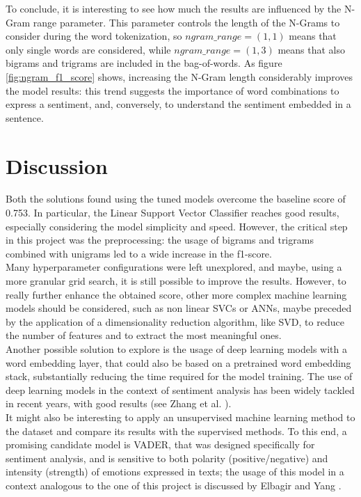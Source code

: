 \documentclass[conference]{IEEEtran}
\begin{document}
To conclude, it is interesting to see how much the results are influenced by the N-Gram range parameter. This parameter controls the length of the N-Grams to consider during the word tokenization, so $ngram\_range=(1,1)$ means that only single words are considered, while $ngram\_range=(1,3)$ means that also bigrams and trigrams are included in the bag-of-words. As figure \ref{fig:ngram_f1_score} shows, increasing the N-Gram length considerably improves the model results: this trend suggests the importance of word combinations to express a sentiment, and, conversely, to understand the sentiment embedded in a sentence. 

\section{Discussion}
Both the solutions found using the tuned models overcome the baseline score of 0.753. In particular, the Linear Support Vector Classifier reaches good results, especially considering the model simplicity and speed. However, the critical step in this project was the preprocessing: the usage of bigrams and trigrams combined with unigrams led to a wide increase in the f1-score.\\
Many hyperparameter configurations were left unexplored, and maybe, using a more granular grid search, it is still possible to improve the results. However, to really further enhance the obtained score, other more complex machine learning models should be considered, such as non linear SVCs or ANNs, maybe preceded by the application of a dimensionality reduction algorithm, like SVD, to reduce the number of features and to extract the most meaningful ones. \\Another possible solution to explore is the usage of deep learning models with a word embedding layer, that could also be based on a pretrained word embedding stack, substantially reducing the time required for the model training. The use of deep learning models in the context of sentiment analysis has been widely tackled in recent years, with good results (see Zhang et al. \cite{ZhangLeiWangShuaiLiuBing}). \\It might also be interesting to apply an unsupervised machine learning method to the dataset and compare its results with the supervised methods. To this end, a promising candidate model is VADER, that was designed specifically for sentiment analysis, and is sensitive to both polarity (positive/negative) and intensity (strength) of emotions expressed in texts; the usage of this model in a context analogous to the one of this project is discussed by Elbagir and Yang \cite{elbagir2019twitter}.



\end{document}
